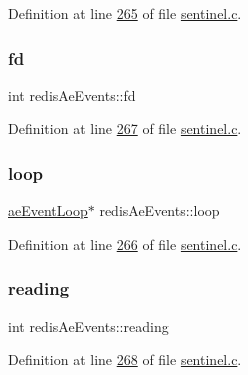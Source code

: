 Definition at line \hyperlink{sentinel_8c_source_l00265}{265} of file \hyperlink{sentinel_8c_source}{sentinel.\+c}.

\mbox{\label{structredisAeEvents_a0223bf4ebfbf5d32886e06147ea30df1}} 
\subsubsection{\texorpdfstring{fd}{fd}}
{\footnotesize\ttfamily int redis\+Ae\+Events\+::fd}



Definition at line \hyperlink{sentinel_8c_source_l00267}{267} of file \hyperlink{sentinel_8c_source}{sentinel.\+c}.

\mbox{\label{structredisAeEvents_abbbedca4a9f5df8e17b39e4bdea83773}} 
\subsubsection{\texorpdfstring{loop}{loop}}
{\footnotesize\ttfamily \hyperlink{structaeEventLoop}{ae\+Event\+Loop}$\ast$ redis\+Ae\+Events\+::loop}



Definition at line \hyperlink{sentinel_8c_source_l00266}{266} of file \hyperlink{sentinel_8c_source}{sentinel.\+c}.

\mbox{\label{structredisAeEvents_abf97765c389403e1c0ee36ac60cd38a5}} 
\subsubsection{\texorpdfstring{reading}{reading}}
{\footnotesize\ttfamily int redis\+Ae\+Events\+::reading}



Definition at line \hyperlink{sentinel_8c_source_l00268}{268} of file \hyperlink{sentinel_8c_source}{sentinel.\+c}.

\mbox{\label{structredisAeEvents_aef1285c4c876d3c7f4616830d5fc9d3e}} 
